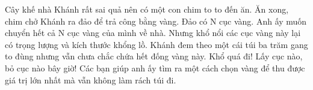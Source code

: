 Cây khế nhà Khánh rất sai quả nên có một con chim to to đến ăn. Ăn xong, chim chở Khánh ra đảo để trả công bằng vàng. Đảo có N cục vàng. Anh ấy muốn chuyển hết cả N cục vàng của mình về nhà. Nhưng khổ nổi các cục vàng này lại có trọng lượng và kích thước khổng lồ. Khánh đem theo một cái túi ba trăm gang to đùng nhưng vẫn chưa chắc chứa hết đống vàng này. Khổ quá đi! Lấy cục nào, bỏ cục nào bây giờ! Các bạn giúp anh ấy tìm ra một cách chọn vàng để thu được giá trị lớn nhất mà vẫn không làm rách túi đi.